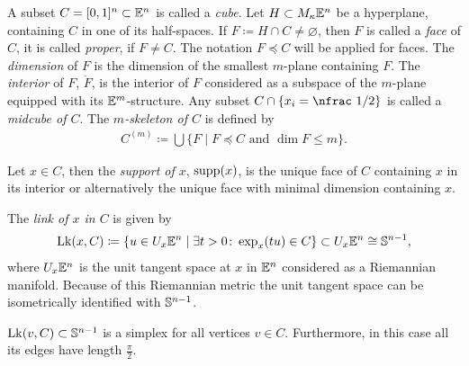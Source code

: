 \begin{defin}[Cubes]
  A subset \(C = [0,1]^n \subset \mathbb{E}^n\) is called a \emph{cube}. Let \(H \subset M_\kappa\mathbb{E}^n\)  be a hyperplane, containing \(C\) in one of its half-spaces. If \(F \coloneqq H \cap C \neq \varnothing\), then \(F\) is called a \emph{face} of \(C\), it is called \emph{proper}, if \(F \neq C\). The notation \(F \preceq C\) will be applied for faces. The \emph{dimension} of \(F\) is the dimension of the smallest \(m\)-plane containing \(F\). The \emph{interior} of \(F\), \(\mathring F\), is the interior of \(F\) considered as a subspace of the \(m\)-plane equipped with its \(\mathbb{E}^m\)-structure. Any subset \(C \cap \{x_i = \text{\nfrac 1/2}\}\) is called a \emph{midcube of \(C\)}. The \emph{\(m\)-skeleton of \(C\)} is defined by
  \begin{align*}
    C^{(m)} \coloneqq \bigcup \{F \mid F \preceq C \text{ and } \dim F \leq m\}.
  \end{align*}

  Let \(x \in C\), then the \emph{support of \(x\)}, \(\operatorname{supp}(x)\), is the unique face of \(C\) containing \(x\) in its interior or alternatively the unique face with minimal dimension containing \(x\).

  The \emph{link of \(x\) in \(C\)} is given by
  \begin{align*}
    \operatorname{Lk}(x,C) \coloneqq \{u \in U_x\mathbb{E}^n \mid \exists t > 0 \colon \exp_x(tu) \in C\} \subset U_x\mathbb{E}^n \cong \mathbb{S}^{n-1},
  \end{align*}
  where \(U_x\mathbb{E}^n\) is the unit tangent space at \(x\) in \(\mathbb{E}^n\) considered as a Riemannian manifold. Because of this Riemannian metric the unit tangent space can be isometrically identified with \(\mathbb{S}^{n-1}\).
\end{defin}

\begin{bsp}
\end{bsp}

\begin{rem}
  \(\operatorname{Lk}(v,C) \subset \mathbb{S}^{n-1}\) is a simplex for all vertices \(v \in C\). Furthermore, in this case all its edges have length \(\frac{\pi}{2}\).
\end{rem}

